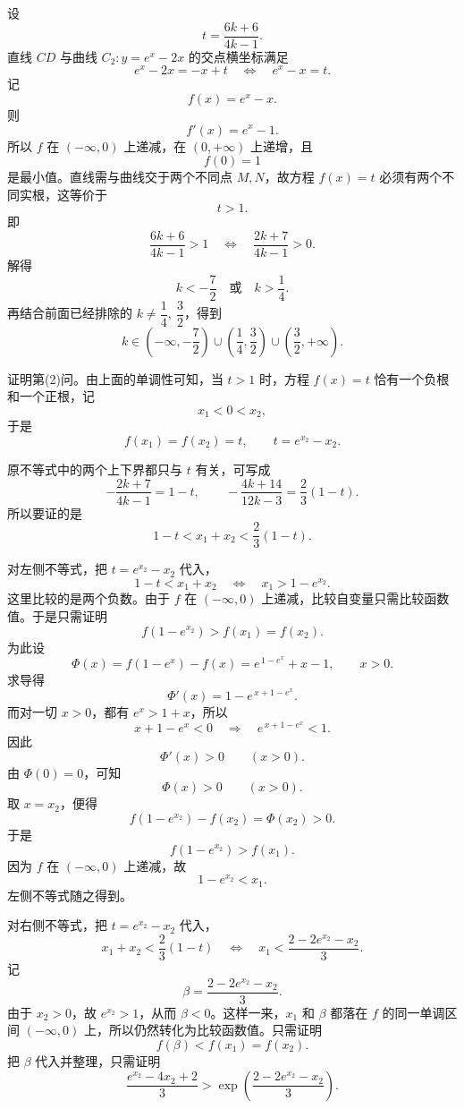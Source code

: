 \begin{solution}
设
\[
t=\frac{6k+6}{4k-1}.
\]
直线 $CD$ 与曲线 $C_2:y=e^x-2x$ 的交点横坐标满足
\[
e^x-2x=-x+t
\quad\Longleftrightarrow\quad
e^x-x=t.
\]
记
\[
f(x)=e^x-x.
\]
则
\[
f'(x)=e^x-1.
\]
所以 $f$ 在 $(-\infty,0)$ 上递减，在 $(0,+\infty)$ 上递增，且
\[
f(0)=1
\]
是最小值。直线需与曲线交于两个不同点 $M,N$，故方程 $f(x)=t$ 必须有两个不同实根，这等价于
\[
t>1.
\]
即
\[
\frac{6k+6}{4k-1}>1
\quad\Longleftrightarrow\quad
\frac{2k+7}{4k-1}>0.
\]
解得
\[
k<-\frac72\quad\text{或}\quad k>\frac14.
\]
再结合前面已经排除的 $k\ne \dfrac14,\ \dfrac32$，得到
\[
k\in\left(-\infty,-\frac72\right)\cup\left(\frac14,\frac32\right)\cup\left(\frac32,+\infty\right).
\]

证明第(2)问。由上面的单调性可知，当 $t>1$ 时，方程 $f(x)=t$ 恰有一个负根和一个正根，记
\[
x_1<0<x_2,
\]
于是
\[
f(x_1)=f(x_2)=t,\qquad t=e^{x_2}-x_2.
\]

原不等式中的两个上下界都只与 $t$ 有关，可写成
\[
-\frac{2k+7}{4k-1}=1-t,\qquad
-\frac{4k+14}{12k-3}=\frac23(1-t).
\]
所以要证的是
\[
1-t<x_1+x_2<\frac23(1-t).
\]

对左侧不等式，把 $t=e^{x_2}-x_2$ 代入，
\[
1-t<x_1+x_2
\quad\Longleftrightarrow\quad
x_1>1-e^{x_2}.
\]
这里比较的是两个负数。由于 $f$ 在 $(-\infty,0)$ 上递减，比较自变量只需比较函数值。于是只需证明
\[
f(1-e^{x_2})>f(x_1)=f(x_2).
\]
为此设
\[
\Phi(x)=f(1-e^x)-f(x)=e^{\,1-e^x}+x-1,\qquad x>0.
\]
求导得
\[
\Phi'(x)=1-e^{\,x+1-e^x}.
\]
而对一切 $x>0$，都有 $e^x>1+x$，所以
\[
x+1-e^x<0
\quad\Longrightarrow\quad
e^{\,x+1-e^x}<1.
\]
因此
\[
\Phi'(x)>0\qquad(x>0).
\]
由 $\Phi(0)=0$，可知
\[
\Phi(x)>0\qquad(x>0).
\]
取 $x=x_2$，便得
\[
f(1-e^{x_2})-f(x_2)=\Phi(x_2)>0.
\]
于是
\[
f(1-e^{x_2})>f(x_1).
\]
因为 $f$ 在 $(-\infty,0)$ 上递减，故
\[
1-e^{x_2}<x_1.
\]
左侧不等式随之得到。

对右侧不等式，把 $t=e^{x_2}-x_2$ 代入，
\[
x_1+x_2<\frac23(1-t)
\quad\Longleftrightarrow\quad
x_1<\frac{2-2e^{x_2}-x_2}{3}.
\]
记
\[
\beta=\frac{2-2e^{x_2}-x_2}{3}.
\]
由于 $x_2>0$，故 $e^{x_2}>1$，从而 $\beta<0$。这样一来，$x_1$ 和 $\beta$ 都落在 $f$ 的同一单调区间 $(-\infty,0)$ 上，所以仍然转化为比较函数值。只需证明
\[
f(\beta)<f(x_1)=f(x_2).
\]
把 $\beta$ 代入并整理，只需证明
\[
\frac{e^{x_2}-4x_2+2}{3}
>
\exp\left(\frac{2-2e^{x_2}-x_2}{3}\right).
\]


\end{solution}
